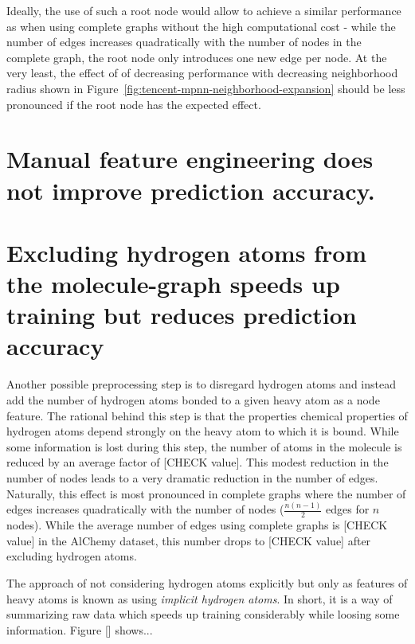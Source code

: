 Ideally, the use of such a root node would allow to achieve a similar performance as when using complete graphs without the high computational cost - while the number of edges increases quadratically with the number of nodes in the complete graph, the root node only introduces one new edge per node. At the very least, the effect of of decreasing performance with decreasing neighborhood radius shown in Figure~\ref{fig:tencent-mpnn-neighborhood-expansion} should be less pronounced if the root node has the expected effect.





\section{Manual feature engineering does not improve prediction accuracy.}


\section{Excluding hydrogen atoms from the molecule-graph speeds up training but reduces prediction accuracy}

Another possible preprocessing step is to disregard hydrogen atoms and instead add the number of hydrogen atoms bonded to a given heavy atom as a node feature. The rational behind this step is that the properties chemical properties of hydrogen atoms depend strongly on the heavy atom to which it is bound. While some information is lost during this step, the number of atoms in the molecule is reduced by an average factor of [CHECK value]. This modest reduction in the number of nodes leads to a very dramatic reduction in the number of edges. Naturally, this effect is most pronounced in complete graphs where the number of edges increases quadratically with the number of nodes ($\frac{n(n - 1)}{2}$ edges for $n$ nodes). While the average number of edges using complete graphs is [CHECK value] in the AlChemy dataset, this number drops to [CHECK value] after excluding hydrogen atoms.

The approach of not considering hydrogen atoms explicitly but only as features of heavy atoms is known as using \textit{implicit hydrogen atoms}. In short, it is a way of summarizing raw data which speeds up training considerably while loosing some information. Figure [] shows...

